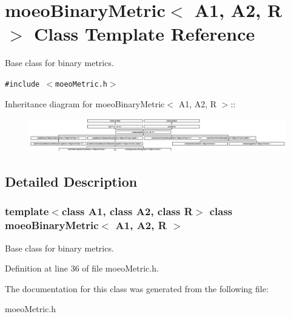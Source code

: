 \section{moeo\-Binary\-Metric$<$ A1, A2, R $>$ Class Template Reference}
\label{classmoeoBinaryMetric}
Base class for binary metrics.  


{\tt \#include $<$moeo\-Metric.h$>$}

Inheritance diagram for moeo\-Binary\-Metric$<$ A1, A2, R $>$::\begin{figure}[H]
\begin{center}
\leavevmode
\includegraphics[height=1.48018cm]{classmoeoBinaryMetric}
\end{center}
\end{figure}


\subsection{Detailed Description}
\subsubsection*{template$<$class A1, class A2, class R$>$ class moeo\-Binary\-Metric$<$ A1, A2, R $>$}

Base class for binary metrics. 



Definition at line 36 of file moeo\-Metric.h.

The documentation for this class was generated from the following file:\begin{CompactItemize}
\item 
moeo\-Metric.h\end{CompactItemize}
